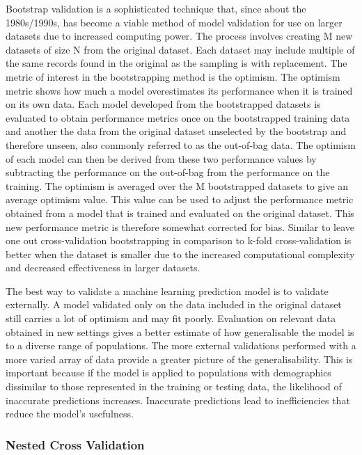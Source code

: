 \documentclass[11pt]{article}
\begin{document}
Bootstrap validation is a sophisticated technique that, since about the 1980s/1990s, has become a viable method of model validation for use on larger datasets due to increased computing power. The process involves creating M new datasets of size N from the original dataset. Each dataset may include multiple of the same records found in the original as the sampling is with replacement. The metric of interest in the bootstrapping method is the optimism. The optimism metric shows how much a model overestimates its performance when it is trained on its own data. Each model developed from the bootstrapped datasets is evaluated to obtain performance metrics once on the bootstrapped training data and another the data from the original dataset unselected by the bootstrap and therefore unseen, also commonly referred to as the out-of-bag data. The optimism of each model can then be derived from these two performance values by subtracting the performance on the out-of-bag from the performance on the training. The optimism is averaged over the M bootstrapped datasets to give an average optimism value. This value can be used to adjust the performance metric obtained from a model that is trained and evaluated on the original dataset. This new performance metric is therefore somewhat corrected for bias. Similar to leave one out cross-validation bootstrapping in comparison to k-fold cross-validation is better when the dataset is smaller due to the increased computational complexity and decreased effectiveness in larger datasets.

The best way to validate a machine learning prediction model is to validate externally. A model validated only on the data included in the original dataset still carries a lot of optimism and may fit poorly. Evaluation on relevant data obtained in new settings gives a better estimate of how generalisable the model is to a diverse range of populations. The more external validations performed with a more varied array of data provide a greater picture of the generalisability. This is important because if the model is applied to populations with demographics dissimilar to those represented in the training or testing data, the likelihood of inaccurate predictions increases. Inaccurate predictions lead to inefficiencies that reduce the model's usefulness.

\subsubsection{Nested Cross Validation}
\end{document}
